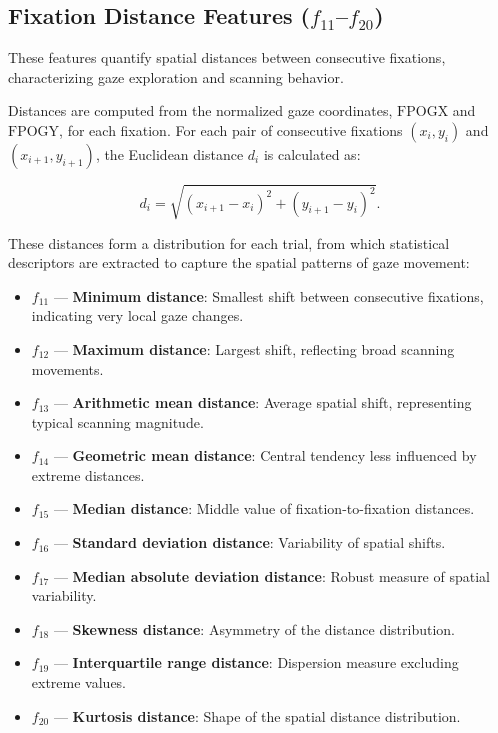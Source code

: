 \documentclass[12pt]{report}
\begin{document}
\subsection[Fixation Distance Features (f11–f20)]{Fixation Distance Features (\(f_{11}\)–\(f_{20}\))}

These features quantify spatial distances between consecutive fixations, characterizing gaze exploration and scanning behavior.  

Distances are computed from the normalized gaze coordinates, \(\mathrm{FPOGX}\) and \(\mathrm{FPOGY}\), for each fixation. 
For each pair of consecutive fixations \((x_i, y_i)\) and \((x_{i+1}, y_{i+1})\), the Euclidean distance \(d_i\) is calculated as:

\[
d_i = \sqrt{(x_{i+1} - x_i)^2 + (y_{i+1} - y_i)^2}.
\]

These distances form a distribution for each trial, from which statistical descriptors are extracted to capture the spatial patterns of gaze movement:

\begin{itemize}
    \item \(f_{11}\) — \textbf{Minimum distance}: Smallest shift between consecutive fixations, indicating very local gaze changes.
    \item \(f_{12}\) — \textbf{Maximum distance}: Largest shift, reflecting broad scanning movements.
    \item \(f_{13}\) — \textbf{Arithmetic mean distance}: Average spatial shift, representing typical scanning magnitude.
    \item \(f_{14}\) — \textbf{Geometric mean distance}: Central tendency less influenced by extreme distances.
    \item \(f_{15}\) — \textbf{Median distance}: Middle value of fixation-to-fixation distances.
    \item \(f_{16}\) — \textbf{Standard deviation distance}: Variability of spatial shifts.
    \item \(f_{17}\) — \textbf{Median absolute deviation distance}: Robust measure of spatial variability.
    \item \(f_{18}\) — \textbf{Skewness distance}: Asymmetry of the distance distribution.
    \item \(f_{19}\) — \textbf{Interquartile range distance}: Dispersion measure excluding extreme values.
    \item \(f_{20}\) — \textbf{Kurtosis distance}: Shape of the spatial distance distribution.
\end{itemize}
\end{document}
